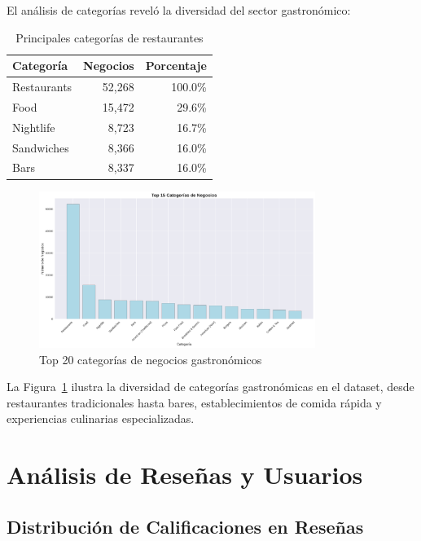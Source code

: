 \documentclass[12pt,a4paper,twoside,openany]{book}
\begin{document}
El análisis de categorías reveló la diversidad del sector gastronómico:

\begin{table}[H]
\centering
\caption{Principales categorías de restaurantes}
\begin{tabular}{@{}lrr@{}}
\toprule
\textbf{Categoría} & \textbf{Negocios} & \textbf{Porcentaje} \\
\midrule
Restaurants & 52,268 & 100.0\% \\
Food & 15,472 & 29.6\% \\
Nightlife & 8,723 & 16.7\% \\
Sandwiches & 8,366 & 16.0\% \\
Bars & 8,337 & 16.0\% \\
\bottomrule
\end{tabular}
\end{table}

\begin{figure}[H]
\centering
\includegraphics[width=0.8\textwidth]{figures/business_top_categories.png}
\caption{Top 20 categorías de negocios gastronómicos}
\label{fig:business_top_categories}
\end{figure}

La Figura~\ref{fig:business_top_categories} ilustra la diversidad de categorías gastronómicas en el dataset, desde restaurantes tradicionales hasta bares, establecimientos de comida rápida y experiencias culinarias especializadas.

\section{Análisis de Reseñas y Usuarios}

\subsection{Distribución de Calificaciones en Reseñas}
\end{document}

